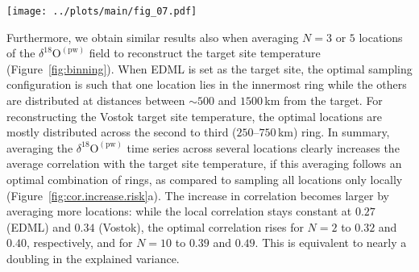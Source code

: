 \documentclass[draft]{agujournal2019}
\begin{document}
\begin{figure*}[t]%
\centering
\texttt{[image: ../plots/main/fig\_07.pdf]}
\caption{%
  The optimal arrangement for averaging three or five
  $\delta^{18}\mathrm{O}^{\mathrm{(pw)}}$ ice cores to reconstruct the target
  site temperature at the EDML (\textbf{a}, \textbf{c}) and Vostok (\textbf{b},
  \textbf{d}) drilling sites. Displayed are subsets of the sampling correlation
  structures for $N=3$ and $5$, showing along the vertical axis the optimal five
  of all possible combinations of rings, i.e., those which exhibit the highest
  mean correlation across $10^5$ random trials of averaging $N=3$ (\textbf{a},
  \textbf{b}) or $N=5$ (\textbf{c}, \textbf{d}) grid cells from these rings. The
  ring bin borders are marked by thin vertical lines with their distances from
  the target site given on the horizontal axis; the selected optimal ring
  combinations are marked as black dots. Systematically, arrangements with
  several ice cores sampled at $500$ to $1000$\,km distances are found to be
  optimal.}
\label{fig:binning}%
\end{figure*}%

Furthermore, we obtain similar results also when averaging $N=3$ or $5$
locations of the $\delta^{18}\mathrm{O}^{\mathrm{(pw)}}$ field to reconstruct
the target site temperature (Figure~\ref{fig:binning}). When EDML is set as the
target site, the optimal sampling configuration is such that one location lies
in the innermost ring while the others are distributed at distances between
$\sim500$ and $1500$\,km from the target. For reconstructing the Vostok target
site temperature, the optimal locations are mostly distributed across the second
to third ($250$--$750$\,km) ring. In summary, averaging the
$\delta^{18}\mathrm{O}^{\mathrm{(pw)}}$ time series across several locations
clearly increases the average correlation with the target site temperature, if
this averaging follows an optimal combination of rings, as compared to sampling
all locations only locally (Figure~\ref{fig:cor.increase.risk}a). The increase in
correlation becomes larger by averaging more locations: while the local
correlation stays constant at $0.27$ (EDML) and $0.34$ (Vostok), the optimal
correlation rises for $N=2$ to $0.32$ and $0.40$, respectively, and for $N=10$
to $0.39$ and $0.49$. This is equivalent to nearly a doubling in the explained
variance.
\end{document}
